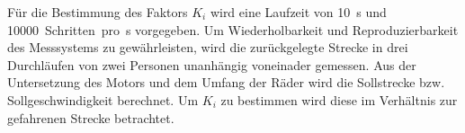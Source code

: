Für die Bestimmung des Faktors $K_i$ wird eine Laufzeit von 10~s und 10000~Schritten~pro~s vorgegeben. Um Wiederholbarkeit und Reproduzierbarkeit des Messsystems zu gewährleisten, wird  die zurückgelegte Strecke in drei Durchläufen von zwei Personen unanhängig voneinader gemessen. Aus der Untersetzung des Motors und dem Umfang der Räder wird die Sollstrecke bzw. Sollgeschwindigkeit berechnet. Um $K_i$ zu bestimmen wird diese im Verhältnis zur gefahrenen Strecke betrachtet.















